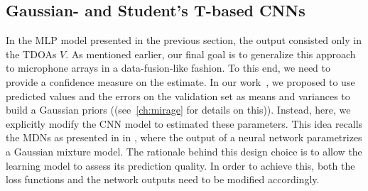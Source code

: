 \subsection{Gaussian- and Student's T-based CNNs}
In the \ac{MLP} model presented in the previous section, the output consisted only in the \acp{TDOA} $V$.
As mentioned earlier, our final goal is to generalize this approach to microphone arrays in a data-fusion-like fashion.
To this end, we need to provide a confidence measure on the estimate.
In our work~, we proposed to use predicted values and the errors on the validation set as means and variances to build a Gaussian priors ((see~\cref{ch:mirage} for details on this)).
Instead, here, we explicitly modify the \ac{CNN} model to estimated these parameters.
This idea recalls the \acp{MDN} as presented in in , where the output of a neural network parametrizes a Gaussian mixture model.
The rationale behind this design choice is to allow the learning model to assess its prediction quality.
In order to achieve this, both the loss functions and the network outputs need to be modified accordingly.
\newcommand{\xiTheta}{{\xi;\params}}
\newcommand{\sigmaTauv}{\ensuremath{\sigma^2_{v}(\xiTheta)}}
\newcommand{\muTauv}{\ensuremath{\mu_{v}(\xiTheta)}}
\newcommand{\sigmaTau}{\ensuremath{\sigma^2_{v}}}
\newcommand{\muTau}{\ensuremath{\mu_{v}}}
\newcommand{\estSigmaTau}{\ensuremath{\sigma^2_{v}}}
\newcommand{\estMuTau}{\ensuremath{\mu_{v}}}

